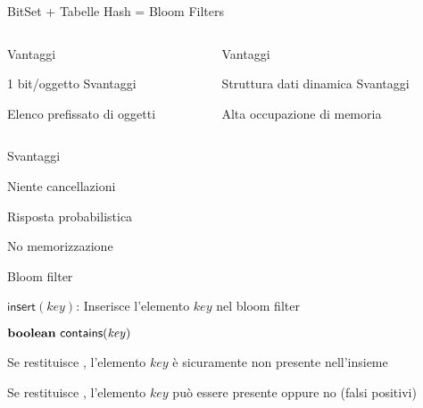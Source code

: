 \begin{frame}{BitSet + Tabelle Hash = Bloom Filters}

\vspace{-12pt}
\begin{columns}[c]
\begin{column}{0.48\textwidth}
\begin{myboxtitle}[BitSet]
\alert{Vantaggi}
\BI
\item 1 bit/oggetto
\EI
\medskip
\alert{Svantaggi}
\BI
\item Elenco prefissato di oggetti
\EI
\end{myboxtitle}

\end{column}
\hfill
\begin{column}{0.48\textwidth}
\begin{myboxtitle}
\alert{Vantaggi}
\BI
\item Struttura dati dinamica
\EI
\medskip
\alert{Svantaggi}
\BI
\item Alta occupazione di memoria
\EI
\end{myboxtitle}

\end{column}
\end{columns}

\medskip
\begin{myboxtitle}
\medskip
{}
{
\alert{Svantaggi}
\BI
\item Niente cancellazioni
\item Risposta probabilistica
\item No memorizzazione
\EI
}
\end{myboxtitle}
\end{frame}

\begin{frame}{Bloom filter}

\vspace{-6pt}
\begin{myboxtitle}[Specifica]
\BI
\item $\textsf{insert}(\mathit{key})$: Inserisce l'elemento $\mathit{key}$ nel bloom filter
\item $\BOOLEAN\ \textsf{contains}(\mathit{key})$\\
\BI
\item Se restituisce \FALSE, l'elemento $\mathit{key}$ è sicuramente non presente
nell'insieme
\item Se restituisce \TRUE, l'elemento $\mathit{key}$ può essere presente oppure no
(\alert{falsi positivi})
\EI
\EI
\end{myboxtitle}

\end{frame}

